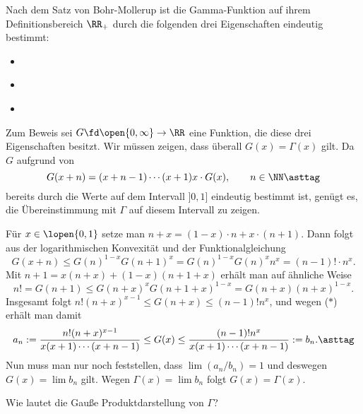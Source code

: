   \begin{antwort}
    Nach dem Satz von Bohr-Mollerup ist die 
    Gamma-Funktion auf ihrem Definitionsbereich 
    $ \RR_+$ durch die folgenden drei Eigenschaften 
    eindeutig bestimmt: 
    \begin{itemize}[2mm]
    \item[\desc{i}] \\[-3mm]
    \item[\desc{ii}] \\[-3mm]
    \item[\desc{iii}] 
    \end{itemize}

    \medskip
    \noindent
    Zum Beweis sei 
    $G\fd \open{0,\infty} \to \RR$ eine Funktion, die diese 
    drei Eigenschaften besitzt. Wir müssen zeigen, dass überall 
    $G(x)=\Gamma(x)$ gilt. Da $G$ aufgrund von 
    \begin{equation}
      G(x+n)=(x+n-1)\cdots( x+1) x \cdot G(x), \qquad n\in \NN
      \asttag
    \end{equation}
    bereits durch die Werte auf dem Intervall $]0,1]$ eindeutig 
    bestimmt ist, genügt es, die Übereinstimmung mit $\Gamma$ auf diesem 
    Intervall zu zeigen.  
    
    Für $x\in \lopen{0,1}$ setze man $n+x=(1-x)\cdot n + x\cdot(n+1)$. 
    Dann folgt aus der logarithmischen Konvexität und 
    der Funktionalgleichung 
    \[
    G(x+n) \le G(n)^{1-x} G(n+1)^x=G(n)^{1-x} G(n)^x n^x = 
    (n-1)! \cdot  n^x.
    \]
    Mit $n+1 = x(n+x)+(1-x)(n+1+x)$ erhält man auf ähnliche Weise
    \[
    n! = G(n+1)\le G(n+x)^x G(n+1+x)^{1-x} = 
    G(n+x)(n+x)^{1-x}.
    \]
    Insgesamt folgt $n!(n+x)^{x-1} \le G(n+x) \le (n-1)! n^x$, und 
    wegen ($\ast$) erhält man damit 
    \[
    a_n := 
    \frac{n!(n+x)^{x-1}}{x(x+1)\cdots (x+n-1)  } 
    \le G(x) \le 
    \frac{(n-1)!n^x}{x(x+1)\cdots (x+n-1) } := b_n. \asttag
    \]
    Nun muss man nur noch feststellen, 
    dass $\lim ( a_n/b_n )=1$ und deswegen 
    $G(x)=\lim b_n$ gilt. 
    Wegen $\Gamma(x)=\lim b_n$ 
    folgt $G(x)=\Gamma(x)$. 
    \AntEnd 
  \end{antwort}

  \begin{frage}
    Wie lautet die Gauß\sch e Produktdarstellung von $\Gamma$? 
  \end{frage}

